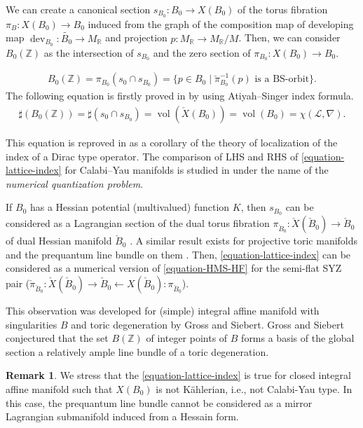 \documentclass[a4paper,dvipdfmx,reqno,12pt]{amsart}
\theoremstyle{definition}
\newtheorem{remark}[theorem]{Remark}
\newcommand{\Z}{\mathbb{Z}}%
\newcommand{\mcal}[1]{\mathcal{#1}}%
\newcommand{\opn}[1]{\operatorname{#1}}
\numberwithin{equation}{section}
\begin{document}
We can create a canonical section 
$s_{B_0}\colon B_0 \to X(B_0)$ of the torus fibration
 $\pi_B:X(B_0)\to B_0$
induced from the graph of the composition map of developing map
$\opn{dev}_{B_0}\colon \widetilde{B_0}\to M_{{\mathbb{R}}}$ 
\cite[p.641]{goldmanRadianceObstructionParallel1984a} and projection
$p:M_{{\mathbb{R}}}\to M_{{\mathbb{R}}}/M$. 
Then, we can consider $B_0(\Z)$ as the intersection of 
$s_{B_0}$ and the zero section of $\pi_{B_0}:X(B_0)\to B_0$.

\begin{align}
B_0(\mathbb{Z})=\pi_{B_0}(s_0\cap s_{B_0})
=\{p\in B_0 \mid  \check{\pi}_{B_0}^{-1}(p) 
\text{ is a BS-orbit}\}.
\end{align}
The following equation is firstly proved in 
\cite[Corollary 4.1]{MR1461965} by using Atiyah--Singer index formula.
\begin{align} \label{equation-lattice-index}
\sharp (B_0(\Z))=\sharp (s_0\cap s_{B_0})
=\opn{vol}(\check{X}(B_0))=\opn{vol}(B_0)
=\chi(\mcal{L},\nabla).
\end{align}

This equation is reproved in \cite{MR2676658} as a 
corollary of the theory of localization of the 
index of a Dirac type operator.
The comparison of LHS and RHS of 
\cref{equation-lattice-index} for
Calabi--Yau manifolds is studied in 
\cite{1999math......2027T} under 
the name of the \emph{numerical quantization problem}.

If $B_0$ has a Hessian potential (multivalued) function $K$, then $s_{B_0}$ can be 
considered as a Lagrangian section of the dual torus 
fibration $\pi_{\check{B}_0}\colon 
\check{X}(\check{B}_0)\to \check{B}_0$ of dual Hessian
manifold $\check{B}_0$ \cite[Proposition 6.9]{MR2567952}.
A similar result exists for projective toric manifolds 
and the prequantum line bundle on them 
\cite[Theorem 3.20]{yamaguchimaster}. 
Then, \cref{equation-lattice-index} can be considered
as a numerical version of \cref{equation-HMS-HF}
for the semi-flat SYZ pair 
($\check{\pi}_{\check{B}_0}\colon \check{X}(\check{B}_0)
\to \check{B}_0 \leftarrow X(\check{B}_0)\colon \pi_{\check{B}_0}$). 

This observation was developed for 
(simple) integral affine manifold with singularities
$B$
and toric degeneration by Gross and Siebert. 
Gross and Siebert conjectured 
that the set $B(\mathbb{Z})$ of integer points of 
$B$ forms a basis of the global section a 
relatively ample line bundle of a toric degeneration.


\begin{remark}
We stress that the \cref{equation-lattice-index} is 
true for closed integral affine manifold 
such that $X(B_0)$ is not K\"ahlerian, i.e., 
not Calabi-Yau type.
In this case,
the prequantum line bundle cannot be considered as
a mirror Lagrangian submanifold induced from a Hessain
form.
\end{remark}
\end{document}
